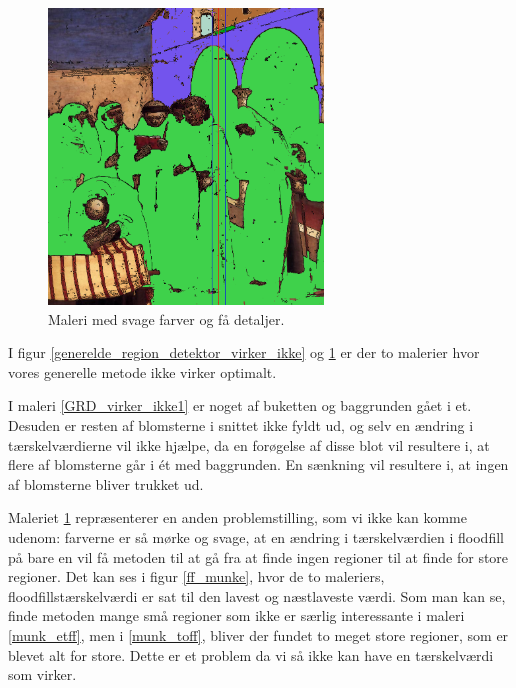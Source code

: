 \begin{figure}[!h]
	\begin{center}
	    \includegraphics[angle=0,width=0.65\textwidth]{afsnit/afprovning/billeder/thressholds/svage_farver/svage_detalier/floodfill/4-4.png}
	\end{center}    
	\caption{Maleri med svage farver og få detaljer.}
    \label{GRD_virker_ikke2}
\end{figure}

I figur \ref{generelde_region_detektor_virker_ikke} og
\ref{GRD_virker_ikke2} er der to malerier hvor
vores generelle metode ikke virker optimalt. 

I maleri \ref{GRD_virker_ikke1} er noget af buketten og baggrunden gået
i et. Desuden er resten af blomsterne i snittet ikke fyldt ud, og selv
en ændring i tærskelværdierne vil ikke hjælpe, da en forøgelse af disse
blot vil resultere i, at flere af blomsterne går i ét med baggrunden. En
sænkning vil resultere i, at ingen af blomsterne bliver trukket ud. 

Maleriet \ref{GRD_virker_ikke2} repræsenterer en anden problemstilling,
som vi ikke kan komme udenom: farverne er så mørke og svage, at en
ændring i tærskelværdien i floodfill på bare en vil få metoden til at gå
fra at finde ingen regioner til at finde for store regioner. Det kan ses
i figur \ref{ff_munke}, hvor de to maleriers, floodfillstærskelværdi
er sat til den lavest og næstlaveste værdi. Som man kan se, finde metoden
mange små regioner som ikke er særlig interessante i maleri
\ref{munk_etff}, men i \ref{munk_toff}, bliver der fundet to meget store
regioner, som er blevet alt for store. Dette er et problem da vi så ikke
kan have en tærskelværdi som virker.

